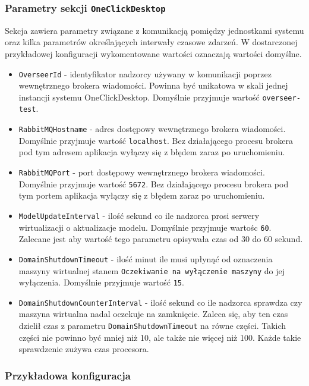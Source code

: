 \documentclass[../opis-rozwiazania.tex]{subfiles}
\begin{document}
\subsubsection{Parametry sekcji \texttt{OneClickDesktop}}
Sekcja zawiera parametry związane z komunikacją pomiędzy jednostkami systemu oraz kilka parametrów określających interwały czasowe zdarzeń.
W dostarczonej przykładowej konfiguracji wykomentowane wartości oznaczają wartości domyślne.
\begin{itemize}
	\item \texttt{OverseerId} - identyfikator nadzorcy używany w komunikacji poprzez wewnętrznego brokera wiadomości. Powinna być unikatowa w skali jednej instancji systemu OneClickDesktop. Domyślnie przyjmuje wartość \texttt{overseer-test}.
	\item \texttt{RabbitMQHostname} - adres dostępowy wewnętrznego brokera wiadomości. Domyślnie przyjmuje wartość \texttt{localhost}. Bez działającego procesu brokera pod tym adresem aplikacja wyłączy się z błędem zaraz po uruchomieniu.
	\item \texttt{RabbitMQPort} - port dostępowy wewnętrznego brokera wiadomości. Domyślnie przyjmuje wartość \texttt{5672}. Bez działającego procesu brokera pod tym portem aplikacja wyłączy się z błędem zaraz po uruchomieniu.
	\item \texttt{ModelUpdateInterval} - ilość sekund co ile nadzorca prosi serwery wirtualizacji o aktualizacje modelu. Domyślnie przyjmuje wartośc \texttt{60}. Zalecane jest aby wartość tego parametru opisywała czas od 30 do 60 sekund.																												%
	\item \texttt{DomainShutdownTimeout} - ilość minut ile musi upłynąć od oznaczenia maszyny wirtualnej stanem \texttt{Oczekiwanie na wył\k aczenie maszyny} do jej wyłączenia. Domyślnie przyjmuje wartość \texttt{15}.
	\item \texttt{DomainShutdownCounterInterval} - ilość sekund co ile nadzorca sprawdza czy maszyna wirtualna nadal oczekuje na zamknięcie. Zaleca się, aby ten czas dzielił czas z parametru \texttt{DomainShutdownTimeout} na równe części. Takich części nie powinno być mniej niż 10, ale także nie więcej niż 100. Każde takie sprawdzenie zużywa czas procesora.
\end{itemize}

\subsubsection{Przykładowa konfiguracja}
\end{document}
